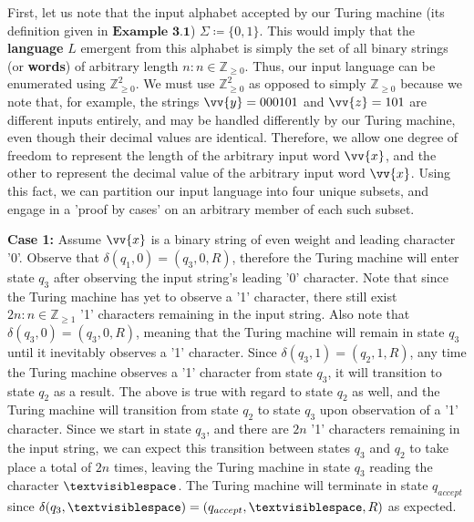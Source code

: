 \documentclass{article}
\begin{document}
\begin{prf}
	First, let us note that the input alphabet accepted by our Turing machine (its definition given in $\textbf{Example 3.1}$) $\Sigma \coloneq \{ 0, 1 \}$.  This would imply that the \textbf{language} $L$ emergent from this alphabet is simply the set of all binary strings (or \textbf{words}) of arbitrary length $n : n \in \mathbb{Z}_{\geq 0}$.  Thus, our input language can be enumerated using $\mathbb{Z}^{2}_{\geq 0}$.  We must use $\mathbb{Z}^{2}_{\geq 0}$ as opposed to simply $\mathbb{Z}_{\geq 0}$ because we note that, for example, the strings $\vv{y}=000101$ and $\vv{z}=101$ are different inputs entirely, and may be handled differently by our Turing machine, even though their decimal values are identical.  Therefore, we allow one degree of freedom to represent the length of the arbitrary input word $\vv{x}$, and the other to represent the decimal value of the arbitrary input word $\vv{x}$.  Using this fact, we can partition our input language into four unique subsets, and engage in a 'proof by cases' on an arbitrary member of each such subset.\\
\begin{adjustwidth}{0.5cm}{}
	\textbf{Case 1:} Assume $\vv{x}$ is a binary string of even weight and leading character '0'.  Observe that $\delta(q_{1}, 0) = (q_{3}, 0, R)$, therefore the Turing machine will enter state $q_{3}$ after observing the input string's leading '0' character.  Note that since the Turing machine has yet to observe a '1' character, there still exist $2n : n \in \mathbb{Z}_{\geq 1}$ '1' characters remaining in the input string.  Also note that $\delta(q_{3}, 0) = (q_{3}, 0, R)$, meaning that the Turing machine will remain in state $q_{3}$ until it inevitably observes a '1' character.  Since $\delta(q_{3}, 1) = (q_{2}, 1, R)$, any time the Turing machine observes a '1' character from state $q_{3}$, it will transition to state $q_{2}$ as a result.  The above is true with regard to state $q_{2}$ as well, and the Turing machine will transition from state $q_{2}$ to state $q_{3}$ upon observation of a '1' character.  Since we start in state $q_{3}$, and there are $2n$ '1' characters remaining in the input string, we can expect this transition between states $q_{3}$ and $q_{2}$ to take place a total of $2n$ times, leaving the Turing machine in state $q_{3}$ reading the character $\textvisiblespace$.  The Turing machine will terminate in state $q_{accept}$ since $\delta(q_{3}, \textvisiblespace) = (q_{accept}, \textvisiblespace, R)$ as expected.\\

\end{adjustwidth}
\end{prf}
\end{document}
